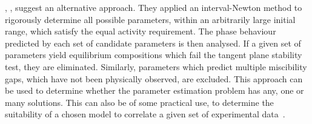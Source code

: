 \citeauthor{ReliableComputationBinaryParams}, \citeyear{ReliableComputationBinaryParams}, suggest an alternative approach. They applied an interval-Newton method to rigorously determine all possible parameters, within an arbitrarily large initial range, which satisfy the equal activity requirement. The phase behaviour predicted by each set of candidate parameters is then analysed. If a given set of parameters yield equilibrium compositions which fail the tangent plane stability test, they are eliminated. Similarly, parameters which predict multiple miscibility gaps, which have not been physically observed, are excluded. This approach can be used to determine whether the parameter estimation problem has any, one or many solutions. This can also be of some practical use, to determine the suitability of a chosen model to correlate a given set of experimental data~\cite{ReliableComputationBinaryParams}.\\


